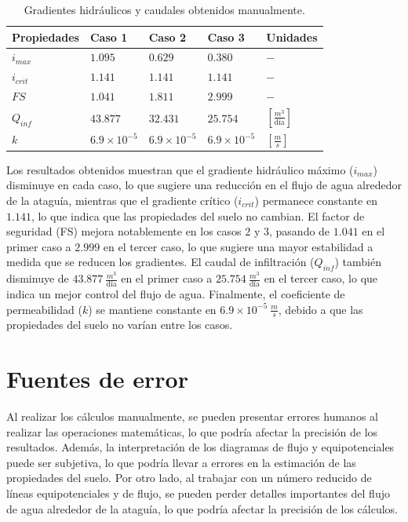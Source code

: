 \begin{table}[H]
    \begin{center}
        \caption{Gradientes hidráulicos y caudales obtenidos manualmente.}
        \begin{tabularx}{0.75\textwidth}{>{\centering\arraybackslash}X >{\centering\arraybackslash}X >{\centering\arraybackslash}X >{\centering\arraybackslash}X >{\centering\arraybackslash}X}
        \hline
        \textbf{Propiedades} & \textbf{Caso 1} & \textbf{Caso 2} & \textbf{Caso 3} & \textbf{Unidades} \\
        \hline
        $i_{max}$ & $1.095$ & $0.629$ & $0.380$ & $-$ \\
        $i_{crit}$ & $1.141$ & $1.141$ & $1.141$ & $-$ \\
        $FS$ & $1.041$ & $1.811$ & $2.999$ & $-$\\
        $Q_{inf}$ & $43.877$ & $32.431$ & $25.754$ & $[\frac{m^3}{\text{día}}]$\\
        $k$ & $6.9 \times 10^{-5}$ & $6.9 \times 10^{-5}$ & $6.9 \times 10^{-5}$ & $[\frac{m}{s}]$\\
        \hline
        \end{tabularx}
        \label{tab:Manuales1}
    \end{center}
\end{table}

Los resultados obtenidos muestran que el gradiente hidráulico máximo ($i_{max}$) disminuye en cada caso, lo que sugiere una reducción en el flujo de agua alrededor de la ataguía, mientras que el gradiente crítico ($i_{crit}$) permanece constante en $1.141$, lo que indica que las propiedades del suelo no cambian. El factor de seguridad (FS) mejora notablemente en los casos 2 y 3, pasando de $1.041$ en el primer caso a $2.999$ en el tercer caso, lo que sugiere una mayor estabilidad a medida que se reducen los gradientes. El caudal de infiltración ($Q_{inf}$) también disminuye de $43.877 \ \frac{m^3}{\text{día}}$ en el primer caso a $25.754 \ \frac{m^3}{\text{día}}$ en el tercer caso, lo que indica un mejor control del flujo de agua. Finalmente, el coeficiente de permeabilidad ($k$) se mantiene constante en $6.9 \times 10^{-5} \ \frac{m}{s}$, debido a que las propiedades del suelo no varían entre los casos.

\section{Fuentes de error}

Al realizar los cálculos manualmente, se pueden presentar errores humanos al realizar las operaciones matemáticas, lo que podría afectar la precisión de los resultados. Además, la interpretación de los diagramas de flujo y equipotenciales puede ser subjetiva, lo que podría llevar a errores en la estimación de las propiedades del suelo. Por otro lado, al trabajar con un número reducido de líneas equipotenciales y de flujo, se pueden perder detalles importantes del flujo de agua alrededor de la ataguía, lo que podría afectar la precisión de los cálculos. 
